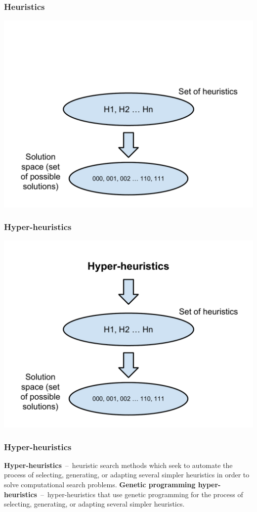 \documentclass{beamer}
\newcommand{\linespace}{\vskip 0.25cm}
\begin{document}
\begin{frame}
	\frametitle{Heuristics}
	\includegraphics[height=.9\textheight]{Illustrations/heuristic_1.PDF}
\end{frame}

\begin{frame}
	\frametitle{Hyper-heuristics}
	\includegraphics[height=.9\textheight]{Illustrations/heuristic_2.PDF}
\end{frame}

\begin{frame}
	\frametitle{Hyper-heuristics}
	\textbf{Hyper-heuristics}~--~heuristic search methods which seek to automate the process of selecting, generating, or adapting several simpler heuristics in order to solve computational search problems.
	\linespace
	\pause
	\textbf{Genetic programming hyper-heuristics}~--~hyper-heuristics that use genetic programming for the process of selecting, generating, or adapting several simpler heuristics.
\end{frame}
\end{document}
